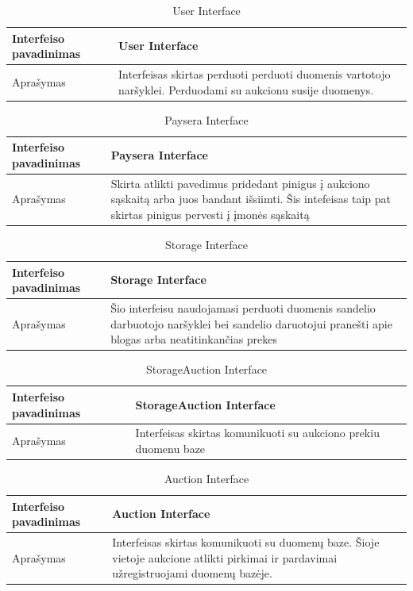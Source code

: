 \documentclass{VUMIFPSmagistrinis}
\begin{document}
				\begin{table}[H]
				\centering
				\begin{tabular}{|L|p{9cm}|}\hline
			 		Interfeiso pavadinimas& User Interface\\ \hline
			 		Aprašymas& Interfeisas skirtas perduoti perduoti duomenis vartotojo naršyklei. Perduodami su aukcionu susije duomenys.  \\ \hline
				\end{tabular}
				\caption{User Interface}
				\end{table}

				\begin{table}[H]
				\centering
				\begin{tabular}{|L|p{9cm}|}\hline
			 		Interfeiso pavadinimas& Paysera Interface\\ \hline
			 		Aprašymas& Skirta atlikti pavedimus pridedant pinigus į aukciono sąskaitą arba juos bandant išsiimti. Šis intefeisas taip pat skirtas pinigus pervesti į įmonės sąskaitą \\ \hline
				\end{tabular}
				\caption{Paysera Interface}
				\end{table}

				\begin{table}[H]
				\centering
				\begin{tabular}{|L|p{9cm}|}\hline
			 		Interfeiso pavadinimas&Storage Interface\\ \hline
			 		Aprašymas&  Šio interfeisu naudojamasi perduoti duomenis sandelio darbuotojo naršyklei bei sandelio daruotojui pranešti apie blogas arba neatitinkančias prekes \\ \hline
				\end{tabular}
				\caption{Storage Interface}
				\end{table}

				\begin{table}[H]
				\centering
				\begin{tabular}{|L|p{9cm}|}\hline
			 		Interfeiso pavadinimas& StorageAuction Interface \\ \hline
			 		Aprašymas&Interfeisas skirtas komunikuoti su aukciono prekiu duomenu baze  \\ \hline
				\end{tabular}
				\caption{ StorageAuction Interface}
				\end{table}

				\begin{table}[H]
				\centering
				\begin{tabular}{|L|p{9cm}|}\hline
			 		Interfeiso pavadinimas& Auction Interface\\ \hline
			 		Aprašymas& Interfeisas skirtas komunikuoti su duomenų baze. Šioje vietoje aukcione atlikti pirkimai ir pardavimai užregistruojami duomenų bazėje. \\ \hline
				\end{tabular}
				\caption{ Auction Interface}
				\end{table}
\end{document}
